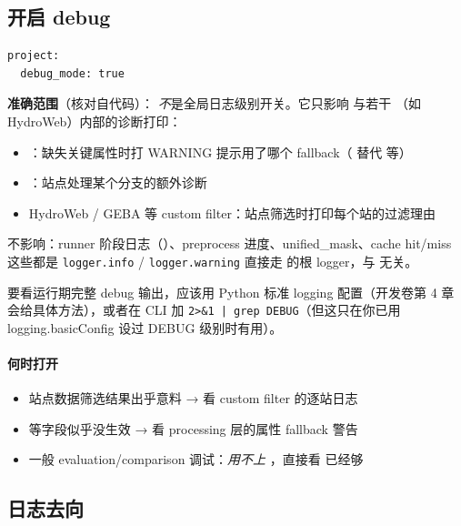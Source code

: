 \subsection{开启 debug}

\begin{verbatim}
project:
  debug_mode: true
\end{verbatim}

\textbf{准确范围}（核对自代码）： \emph{不}是全局日志级别开关。它只影响  与若干 （如 HydroWeb）内部的诊断打印：

\begin{itemize}
  \item {}：缺失关键属性时打 WARNING 提示用了哪个 fallback（ 替代  等）
  \item {}：站点处理某个分支的额外诊断
  \item HydroWeb / GEBA 等 custom filter：站点筛选时打印每个站的过滤理由
\end{itemize}

不影响：runner 阶段日志（）、preprocess 进度、unified\_mask、cache hit/miss 这些都是 \texttt{logger.info} / \texttt{logger.warning} 直接走 \openbench{} 的根 logger，与  无关。

要看运行期完整 debug 输出，应该用 Python 标准 logging 配置（开发卷第 4 章会给具体方法），或者在 CLI 加 \texttt{2>\&1 | grep DEBUG}（但这只在你已用 logging.basicConfig 设过 DEBUG 级别时有用）。

\paragraph{何时打开}

\begin{itemize}
  \item 站点数据筛选结果出乎意料 → 看 custom filter 的逐站日志
  \item {} 等字段似乎没生效 → 看 processing 层的属性 fallback 警告
  \item 一般 evaluation/comparison 调试：\emph{用不上 }，直接看  已经够
\end{itemize}

\subsection{日志去向}

